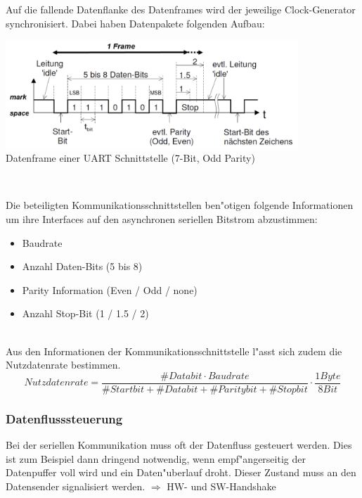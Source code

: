 Auf die fallende Datenflanke des Datenframes wird der jeweilige Clock-Generator synchronisiert. Dabei haben Datenpakete folgenden Aufbau:\\
	\begin{minipage}{11cm}
		\includegraphics[width=11cm]{images/datenframe-uart}\\
		Datenframe einer UART Schnittstelle (7-Bit, Odd Parity)
	\end{minipage}
	\begin{minipage}{0.5cm}
		\-\
	\end{minipage}
	\begin{minipage}{7cm}
		Die beteiligten Kommunikationsschnittstellen ben"otigen folgende Informationen um ihre Interfaces auf den asynchronen seriellen Bitstrom abzustimmen:
		\begin{itemize}
			\item Baudrate
			\item Anzahl Daten-Bits (5 bis 8)
			\item Parity Information (Even / Odd / none)
			\item Anzahl Stop-Bit (1 / 1.5 / 2)
		\end{itemize}
	\end{minipage}\\

Aus den Informationen der Kommunikationsschnittstelle l"asst sich zudem die Nutzdatenrate bestimmen.
	\begin{equation*}
		Nutzdatenrate = \frac{\#Databit \cdot Baudrate}{\#Startbit + \#Databit + \#Paritybit + \#Stopbit} \cdot \frac{1 Byte}{8 Bit}
	\end{equation*}
	
\newpage
\subsubsection{Datenflusssteuerung}
Bei der seriellen Kommunikation muss oft der Datenfluss gesteuert werden. Dies ist zum Beispiel dann dringend notwendig, wenn empf"angerseitig der Datenpuffer voll wird und ein Daten"uberlauf droht. Dieser Zustand muss an den Datensender signalisiert werden. $\Rightarrow$ HW- und SW-Handshake\\

